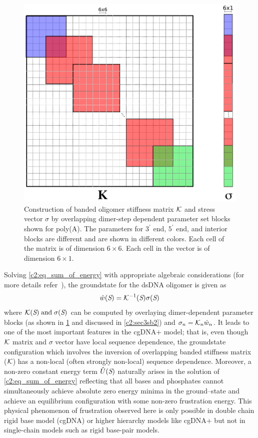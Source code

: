 \begin{figure}[htb]
\begin{center}
\centering\includegraphics[scale=0.26]{images/combine_matrix.png} %
\centering\caption{
Construction of banded oligomer stiffness matrix ${\mathcal K}$ and stress vector $\sigma$ by overlapping dimer-step dependent parameter set blocks shown for poly(A).
The parameters for $3^\prime$ end, $5^\prime$ end, and interior blocks are different and are shown in different colors.
Each cell of the matrix is of dimension $6\times 6$. Each cell in the vector is of dimension $6\times1$.
}
\label{c2:fig3}
\end{center}
\end{figure}

Solving \cref{c2:eq_sum_of_energy} with appropriate algebraic considerations (for more details refer~\cite{petthesis}), the groundstate for the dsDNA oligomer is given as
\begin{equation}
\hat{w}({\textit{S}}) = {\mathcal K}^{-1}({\textit{S}})\sigma({\textit{S}})
\label{c2:eq10}
\end{equation}
where ${\mathcal K}({\textit{S}}) {\;\text{and\;}} \sigma({\textit{S}})$ can be computed by overlaying dimer-dependent parameter blocks (as shown in \cref{c2:fig3} and discussed in \cref{c2:sec3sb2}) and $\sigma_n = {\mathcal K}_n\hat{w}_n$.
It leads to one of the most important features in the cgDNA$+$ model; that is, even though ${\mathcal K}$ matrix and $\sigma$ vector have local sequence dependence, the groundstate configuration which involves the inversion of overlapping banded stiffness matrix (${\mathcal K}$) has a non-local (often strongly non-local) sequence dependence. 
Moreover, a non-zero constant energy term $\hat{U}({\textit{S}})$ naturally arises in the solution of \cref{c2:eq_sum_of_energy} reflecting that all bases and phosphates cannot simultaneously achieve absolute zero energy minima in the ground–state and achieve an equilibrium configuration with some non-zero frustration energy.
This physical phenomenon of frustration observed here is only possible in double chain rigid base model (cgDNA) or higher hierarchy models like cgDNA$+$ but not in single-chain models such as rigid base-pair models.


